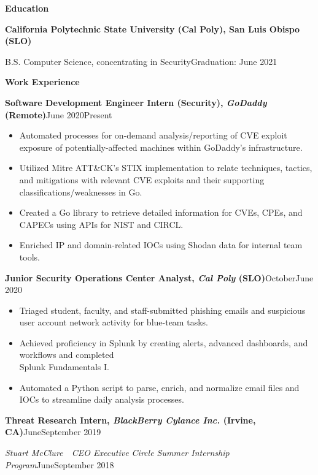 \documentclass[10.5pt]{article}
\newcommand{\resumesection}[2]{
  \vspace{1em}
  \noindent\Large{\textbf{#1}}\hfill\normalsize{#2}
}
\newcommand{\resumelistitem}[1]{
  \item{\normalsize{#1}}
}
\newcommand{\resumejobtitle}[5]{
  \vspace{0.6em}
  \noindent\large{\textbf{#1, \textit{#2} (#3)}}\hfill\normalsize{#4\textemdash#5}
}
\begin{document}
  \pagestyle{resumeheader}

  \resumesection{Education}{~}

    \indent\textbf{California Polytechnic State University (Cal Poly), San Luis Obispo (SLO)}

    \indent\indent\small{B.S. Computer Science, concentrating in Security}\hfill\normalsize{Graduation: June 2021}

  \resumesection{Work Experience}{~}

    \resumejobtitle{Software Development Engineer Intern (Security)}{GoDaddy}{Remote}{June 2020}{Present}

    \begin{itemize}
      \setlength{\itemsep}{0.15pt}
      \resumelistitem{Automated processes for on-demand analysis/reporting of CVE exploit exposure of potentially-affected machines within GoDaddy's infrastructure.}
      \resumelistitem{Utilized Mitre ATT\&CK's STIX implementation to relate
        techniques, tactics, and mitigations with relevant CVE
        exploits and their supporting classifications/weaknesses in Go.}
      \resumelistitem{Created a Go library to retrieve detailed information for
        CVEs, CPEs, and CAPECs using APIs for NIST and CIRCL.}
      \resumelistitem{Enriched IP and domain-related IOCs using Shodan data for internal team tools.}
    \end{itemize}

    \resumejobtitle{Junior Security Operations Center Analyst}{Cal Poly}{SLO}{October}{June 2020}

    \begin{itemize}
      \setlength{\itemsep}{0.15pt}
      \resumelistitem{Triaged student, faculty, and staff-submitted phishing emails and suspicious user account network activity for blue-team tasks.}
      \resumelistitem{Achieved proficiency in Splunk by creating alerts, advanced dashboards, and workflows and completed \\ Splunk Fundamentals I.}
      \resumelistitem{Automated a Python script to parse, enrich, and normalize email files and IOCs to streamline daily analysis processes.}
    \end{itemize}

    \resumejobtitle{Threat Research Intern}{BlackBerry Cylance Inc.}{Irvine, CA}{June}{September 2019}

    \noindent\small\textit{Stuart McClure~\textemdash~CEO Executive Circle Summer Internship Program}\hfill\normalsize{June\textemdash September 2018}
\end{document}

